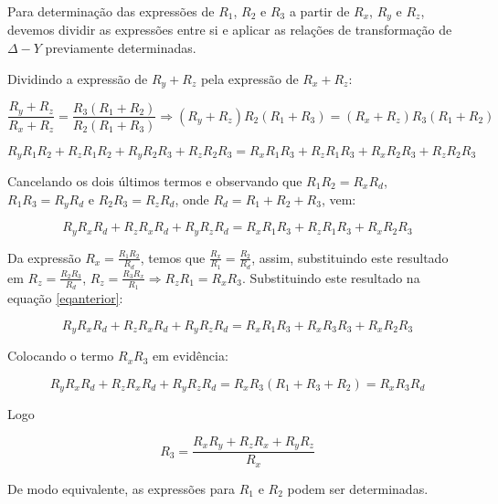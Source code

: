\documentclass[12pt,fleqn]{book} %
\begin{document}
    Para determinação das expressões de $R_1$, $R_2$ e $R_3$ a partir de $R_x$, $R_y$ e $R_z$, devemos dividir as expressões entre si e aplicar as relações de transformação de $\Delta - Y$ previamente determinadas.
    
    Dividindo a expressão de $R_y+R_z$ pela expressão de $R_x+R_z$:
    
    \begin{equation}
    \frac{R_y+R_z}{R_x+R_z} = \frac{R_3 (R_1+R_2)}{R_2 (R_1+R_3)} \Rightarrow (R_y+R_z)R_2 (R_1+R_3 )=(R_x+R_z ) R_3 (R_1+R_2)
    \end{equation}
    
    \begin{equation}
    R_y R_1 R_2+R_z R_1 R_2+R_y R_2 R_3+R_z R_2 R_3=R_x R_1 R_3+R_z R_1 R_3+R_x R_2 R_3+R_z R_2 R_3
    \end{equation}
    
    Cancelando os dois últimos termos e observando que $R_1 R_2=R_x R_d$, $R_1 R_3=R_y R_d$ e $R_2 R_3=R_z R_d$, onde $R_d=R_1+R_2+R_3$, vem:
    
    \begin{equation}\label{eqanterior}
    R_y R_x R_d+R_z R_x R_d+R_y R_z R_d=R_x R_1 R_3+R_z R_1 R_3+R_x R_2 R_3
    \end{equation}
    
    Da expressão $R_x=\frac{R_1 R_2}{R_d}$, temos que $\frac{R_x}{R_1} = \frac{R_2}{R_d}$, assim, substituindo este resultado em $R_z=\frac{R_2 R_3}{R_d}$, $R_z=\frac{R_3 R_x}{R_1} \Rightarrow R_z R_1=R_x R_3$. Substituindo este resultado na equação \ref{eqanterior}:
    
    \begin{equation}
    R_y R_x R_d+R_z R_x R_d+R_y R_z R_d=R_x R_1 R_3+R_x R_3 R_3+R_x R_2 R_3
    \end{equation}
    
    Colocando o termo $R_xR_3$ em evidência:
    
    \begin{equation}
    R_y R_x R_d+R_z R_x R_d+R_y R_z R_d=R_x R_3 (R_1+R_3+R_2 )=R_x R_3 R_d
    \end{equation}
    
    Logo
    
    \begin{equation}
    R_3=\frac{R_x R_y+R_z R_x+R_y R_z}{R_x}
    \end{equation}
    
    De modo equivalente, as expressões para $R_1$ e $R_2$ podem ser determinadas.
    
\end{document}
